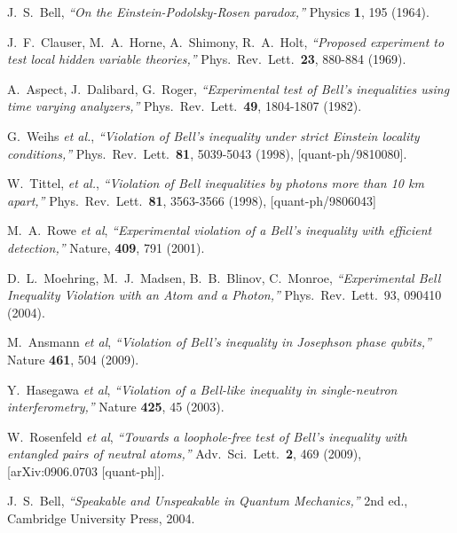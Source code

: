 \documentclass[12pt]{article}                    %
\begin{document}
\begin{thebibliography}{}

  J.~S.~Bell,
  {\it ``On the Einstein-Podolsky-Rosen paradox,''}
  Physics {\bf 1}, 195 (1964).

  J.~F.~Clauser, M.~A.~Horne, A.~Shimony, R.~A.~Holt,
  {\it ``Proposed experiment to test local hidden variable theories,''}
  Phys.\ Rev.\ Lett.\  {\bf 23}, 880-884 (1969).

  A.~Aspect, J.~Dalibard, G.~Roger,
  {\it ``Experimental test of Bell's inequalities using time varying analyzers,''}
  Phys.\ Rev.\ Lett.\  {\bf 49}, 1804-1807 (1982).

  G.~Weihs {\it et al.},
  {\it ``Violation of Bell's inequality under strict Einstein locality conditions,''}
  Phys.\ Rev.\ Lett.\  {\bf 81}, 5039-5043 (1998),
  [quant-ph/9810080].

  W.~Tittel, {\it et al.},
  {\it ``Violation of Bell inequalities by photons more than 10 km apart,''}
  Phys.\ Rev.\ Lett.\  {\bf 81}, 3563-3566 (1998),
  [quant-ph/9806043]


 M.~A.~Rowe {\it et al}, {\it ``Experimental violation of a Bell's inequality with efficient detection,''} Nature, {\bf 409},
791 (2001).


 D.~L.~Moehring, M.~J.~Madsen, B.~B.~Blinov, C.~Monroe, {\it ``Experimental Bell Inequality Violation with an Atom and a Photon,''}
Phys.\ Rev.\ Lett.\ 93, 090410 (2004).

 M.~Ansmann {\it et al}, {\it ``Violation of Bell's inequality in Josephson phase qubits,''} Nature 
{\bf 461}, 504 (2009).

 Y.~Hasegawa {\it et al}, {\it ``Violation of a Bell-like inequality in single-neutron interferometry,''}
Nature {\bf 425}, 45 (2003).

 W.~Rosenfeld {\it et al}, {\it ``Towards a loophole-free test of Bell's inequality with entangled pairs of neutral atoms,''}
Adv.\ Sci.\ Lett.\ {\bf 2}, 469 (2009), [arXiv:0906.0703 [quant-ph]].


 J.~S.~Bell, {\it ``Speakable and Unspeakable in Quantum Mechanics,''} 2nd ed., Cambridge University Press, 2004.  


\end{thebibliography}
\end{document}
